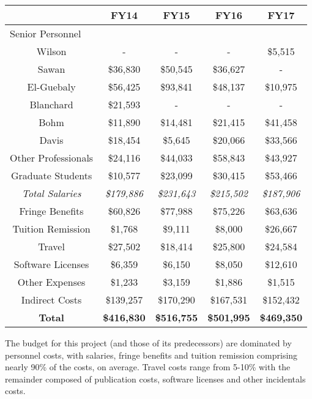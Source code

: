 \begin{center}
\begin{tabular}{|c|c|c|c|c|}\hline
                        & FY14 & FY15 & FY16 & FY17 \\\hline\hline
  \multicolumn{5}{|l|}{Senior Personnel }\\\hline
  Wilson                &      -    &     -     &     -     &   \$5,515 \\\hline
  Sawan                 &  \$36,830 &  \$50,545 &  \$36,627 &     -     \\\hline
  El-Guebaly            &  \$56,425 &  \$93,841 &  \$48,137 &  \$10,975 \\\hline
  Blanchard             &  \$21,593 &      -    &      -    &    -      \\\hline
  Bohm                  &  \$11,890 &  \$14,481 &  \$21,415 &  \$41,458 \\\hline
  Davis                 &  \$18,454 &   \$5,645 &  \$20,066 &  \$33,566 \\\hline\hline
  Other Professionals   &  \$24,116 &  \$44,033 &  \$58,843 &  \$43,927 \\\hline\hline
  Graduate Students     &  \$10,577 &  \$23,099 &  \$30,415 &  \$53,466 \\\hline\hline
  \emph{Total Salaries} & \emph{\$179,886} & \emph{\$231,643} & \emph{\$215,502} & \emph{\$187,906} \\\hline\hline
  Fringe Benefits       &  \$60,826 &  \$77,988 &  \$75,226 &  \$63,636 \\\hline\hline
  Tuition Remission     &   \$1,768 &   \$9,111 &   \$8,000 &  \$26,667 \\\hline\hline
  Travel                &  \$27,502 &  \$18,414 &  \$25,800 &  \$24,584 \\\hline\hline
  Software Licenses     &   \$6,359 &   \$6,150 &   \$8,050 &  \$12,610 \\\hline\hline
  Other Expenses        &   \$1,233 &   \$3,159 &   \$1,886 &   \$1,515 \\\hline\hline
  Indirect Costs        & \$139,257 & \$170,290 & \$167,531 & \$152,432 \\\hline\hline
  \textbf{Total}        & \textbf{\$416,830} & \textbf{\$516,755} & \textbf{\$501,995} & \textbf{\$469,350} \\\hline
\end{tabular}
\end{center}

\noindent The budget for this project (and those of its predecessors) are
dominated by personnel costs, with salaries, fringe benefits and tuition
remission comprising nearly 90\% of the costs, on average.  Travel costs range
from 5-10\% with the remainder composed of publication costs, software
licenses and other incidentals costs.

